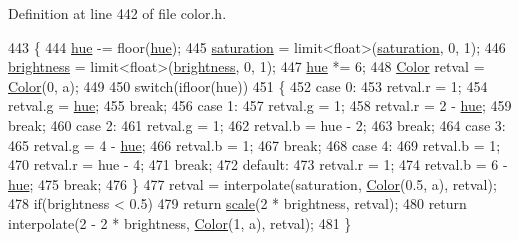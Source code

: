 Definition at line 442 of file color.\+h.


\begin{DoxyCode}
443 \{
444     \hyperlink{structColor_a183b93e13e713514a4bee5fdbd8a5a9b}{hue} -= floor(\hyperlink{structColor_a183b93e13e713514a4bee5fdbd8a5a9b}{hue});
445     \hyperlink{structColor_a225af5fdfba5d0d6d4d660a1f4c9a509}{saturation} = limit<float>(\hyperlink{structColor_a225af5fdfba5d0d6d4d660a1f4c9a509}{saturation}, 0, 1);
446     \hyperlink{structColor_a7eb1a828a3e3c6a3c5e5843a0413f485}{brightness} = limit<float>(\hyperlink{structColor_a7eb1a828a3e3c6a3c5e5843a0413f485}{brightness}, 0, 1);
447     \hyperlink{structColor_a183b93e13e713514a4bee5fdbd8a5a9b}{hue} *= 6;
448     \hyperlink{structColor}{Color} retval = \hyperlink{structColor_a9a742cbe9f9f4037f5d9f4e81a9b2428}{Color}(0, a);
449 
450     \textcolor{keywordflow}{switch}(ifloor(hue))
451     \{
452         \textcolor{keywordflow}{case} 0:
453             retval.r = 1;
454             retval.g = \hyperlink{structColor_a183b93e13e713514a4bee5fdbd8a5a9b}{hue};
455             \textcolor{keywordflow}{break};
456         \textcolor{keywordflow}{case} 1:
457             retval.g = 1;
458             retval.r = 2 - \hyperlink{structColor_a183b93e13e713514a4bee5fdbd8a5a9b}{hue};
459             \textcolor{keywordflow}{break};
460         \textcolor{keywordflow}{case} 2:
461             retval.g = 1;
462             retval.b = hue - 2;
463             \textcolor{keywordflow}{break};
464         \textcolor{keywordflow}{case} 3:
465             retval.g = 4 - \hyperlink{structColor_a183b93e13e713514a4bee5fdbd8a5a9b}{hue};
466             retval.b = 1;
467             \textcolor{keywordflow}{break};
468         \textcolor{keywordflow}{case} 4:
469             retval.b = 1;
470             retval.r = hue - 4;
471             \textcolor{keywordflow}{break};
472         \textcolor{keywordflow}{default}:
473             retval.r = 1;
474             retval.b = 6 - \hyperlink{structColor_a183b93e13e713514a4bee5fdbd8a5a9b}{hue};
475             \textcolor{keywordflow}{break};
476     \}
477     retval = interpolate(saturation, \hyperlink{structColor_a9a742cbe9f9f4037f5d9f4e81a9b2428}{Color}(0.5, a), retval);
478     \textcolor{keywordflow}{if}(brightness < 0.5)
479         \textcolor{keywordflow}{return} \hyperlink{structColor_ac863751b53da826f397a0a3e1791214c}{scale}(2 * brightness, retval);
480     \textcolor{keywordflow}{return} interpolate(2 - 2 * brightness, \hyperlink{structColor_a9a742cbe9f9f4037f5d9f4e81a9b2428}{Color}(1, a), retval);
481 \}
\end{DoxyCode}
